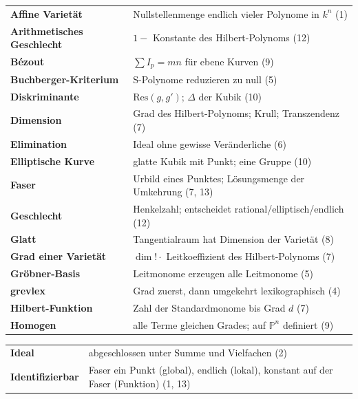 \begin{merksatz}
\begin{center}
{\small
\renewcommand{\arraystretch}{1.42}
\begin{tabular}{@{}P{3.4cm}P{5.2cm}@{}}
\toprule
\textbf{Affine Varietät} & Nullstellenmenge endlich vieler Polynome in $k^{n}$ (1)\\
\textbf{Arithmetisches Geschlecht} & $1 - $ Konstante des Hilbert-Polynoms (12)\\
\textbf{Bézout} & $\sum I_p = mn$ für ebene Kurven (9)\\
\textbf{Buchberger-Kriterium} & S-Polynome reduzieren zu null (5)\\
\textbf{Diskriminante} & $\mathrm{Res}(g, g')$; $\Delta$ der Kubik (10)\\
\textbf{Dimension} & Grad des Hilbert-Polynoms; Krull; Transzendenz (7)\\
\textbf{Elimination} & Ideal ohne gewisse Veränderliche (6)\\
\textbf{Elliptische Kurve} & glatte Kubik mit Punkt; eine Gruppe (10)\\
\textbf{Faser} & Urbild eines Punktes; Lösungsmenge der Umkehrung (7, 13)\\
\textbf{Geschlecht} & Henkelzahl; entscheidet rational/elliptisch/endlich (12)\\
\textbf{Glatt} & Tangentialraum hat Dimension der Varietät (8)\\
\textbf{Grad einer Varietät} & $\dim!\cdot$ Leitkoeffizient des Hilbert-Polynoms (7)\\
\textbf{Gröbner-Basis} & Leitmonome erzeugen alle Leitmonome (5)\\
\textbf{grevlex} & Grad zuerst, dann umgekehrt lexikographisch (4)\\
\textbf{Hilbert-Funktion} & Zahl der Standardmonome bis Grad $d$ (7)\\
\textbf{Homogen} & alle Terme gleichen Grades; auf $\mathbb P^{n}$ definiert (9)\\
\bottomrule
\end{tabular}}
\end{center}
\begin{center}
{\small
\renewcommand{\arraystretch}{1.42}
\begin{tabular}{@{}P{3.4cm}P{5.2cm}@{}}
\toprule
\textbf{Ideal} & abgeschlossen unter Summe und Vielfachen (2)\\
\textbf{Identifizierbar} & Faser ein Punkt (global), endlich (lokal), konstant auf der Faser (Funktion) (1, 13)\\

\end{tabular}}
\end{center}
\end{merksatz}
